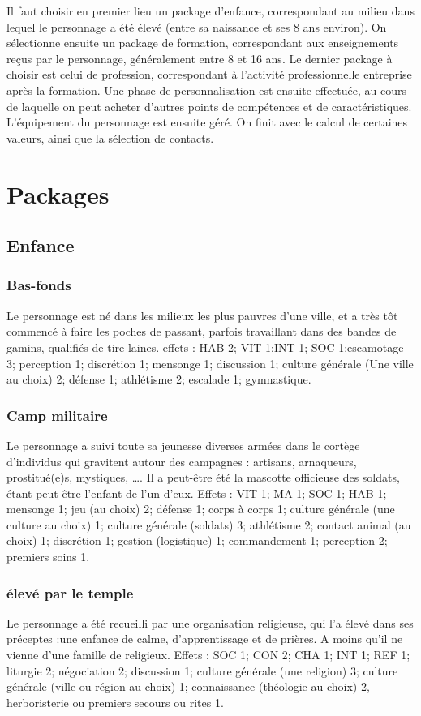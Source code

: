 \documentclass[10pt,a4paper,twocolumn]{book}
\begin{document}
Il faut choisir en premier lieu un package d’enfance, correspondant au milieu dans lequel le personnage a été élevé (entre sa naissance et ses 8 ans environ).
On sélectionne ensuite un package de formation, correspondant aux enseignements reçus par le personnage, généralement entre 8 et 16 ans.
Le dernier package à choisir est celui de profession, correspondant à l’activité professionnelle entreprise après la formation.
Une phase de personnalisation est ensuite effectuée, au cours de laquelle on peut acheter d’autres points de compétences et de caractéristiques.
L’équipement du personnage est ensuite géré.
On finit avec le calcul de certaines valeurs, ainsi que la sélection de contacts.
\section{Packages}
\subsection{Enfance}
\subsubsection{Bas-fonds}
Le personnage est né dans les milieux les plus pauvres d’une ville, et a très tôt commencé à faire les poches de passant, parfois travaillant dans des bandes de gamins, qualifiés de tire-laines.
effets : HAB 2; VIT 1;INT 1; SOC 1;escamotage 3; perception 1; discrétion 1; mensonge 1; discussion 1; culture générale (Une ville au choix) 2; défense 1; athlétisme 2; escalade 1; gymnastique.
\subsubsection{Camp militaire}
Le personnage a suivi toute sa jeunesse diverses armées dans le cortège d’individus qui gravitent autour des campagnes : artisans, arnaqueurs, prostitué(e)s, mystiques, …. Il a peut-être été la mascotte officieuse des soldats, étant peut-être l’enfant de l’un d’eux.
Effets : VIT 1; MA 1; SOC 1; HAB 1; mensonge 1; jeu (au choix) 2; défense 1; corps à corps 1; culture générale (une culture au choix) 1; culture générale (soldats) 3;  athlétisme 2; contact animal (au choix) 1; discrétion 1; gestion (logistique) 1; commandement 1; perception 2; premiers soins 1.
\subsubsection{élevé par le temple}
Le personnage a été recueilli par une organisation religieuse, qui l’a élevé dans ses préceptes :une enfance de calme, d’apprentissage et de prières. A moins qu’il ne vienne d’une famille de religieux.
Effets : SOC 1; CON 2; CHA 1; INT 1; REF 1; liturgie 2; négociation 2; discussion 1; culture générale (une religion) 3; culture générale (ville ou région au choix) 1; connaissance (théologie au choix) 2, herboristerie ou premiers secours ou rites 1.
\end{document}
